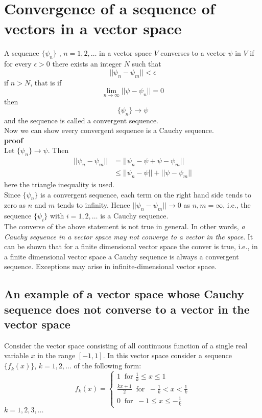 \section{Convergence of a sequence of vectors in a vector space}
A sequence $\{\psi_n\}$ , $n = 1, 2, \ldots$ in a vector space $V$ converses to a vector $\psi$ in $V$ if for every $\epsilon > 0$ there exists an integer $N$ such that
\begin{equation}\label{eqn:2.86}
||\psi_n - \psi_m || < \epsilon
\end{equation}
if $n > N$, that is if
\begin{equation}\label{eqn:2.87}
\lim\limits_{n\rightarrow \infty} ||\psi - \psi_n|| = 0
\end{equation}
then 
\begin{equation}\label{eqn:2.88}
\{\psi_n \} \rightarrow \psi
\end{equation}
and the sequence is called a convergent sequence.\\
Now we can show every convergent sequence is a Cauchy sequence.\\
\textbf{proof}\\
Let $\{\psi_n \} \rightarrow \psi$. Then
\begin{eqnarray}\label{eqn:2.89-2.90}
	|| \psi_n - \psi_m || &= ||\psi_n - \psi + \psi -\psi_m|| \\
	&\leq ||\psi_n - \psi|| + ||\psi -\psi_m||
\end{eqnarray}
here the triangle inequality is used.\\
Since $\{\psi_n \}$ is a convergent sequence, each term on the right hand side tends to zero as $n$ and $m$ tends to infinity. Hence $||\psi_n - \psi_m|| \rightarrow 0$ as $n,m=\infty$, i.e., the sequence $\{\psi_i\}$ with $i=1,2,\ldots$ is a Cauchy sequence.\\
The converse of the above statement is not true in general. In other words, \textit{a Cauchy sequence in a vector space may not converge to a vector in the space}. It can be shown that for a finite dimensional vector space the conver is true, i.e., in a finite dimensional vector space a Cauchy sequence is always a convergent sequence. Exceptions may arise in infinite-dimensional vector space.

\subsection{An example of a vector space whose Cauchy sequence does not converse to a vector in the vector space}
Consider the vector space consisting of all continuous function of a single real variable $x$ in the range $[-1, 1]$. In this vector space consider a sequence $\{f_k (x) \}$, $k = 1,2,\ldots$ of the following form:
\begin{equation}\label{eqn:2.91}
f_k(x) = \begin{cases}
1 \ \text{ for } \frac{1}{k} \leq x \leq 1 \\
\frac{k x + 1}{2} \ \text{ for } \ -\frac{1}{k} < x < \frac{1}{k} \\
0 \ \text{ for } \ -1 \leq x \leq - \frac{1}{k}
\end{cases}
\end{equation}
$k = 1, 2, 3, \ldots$

